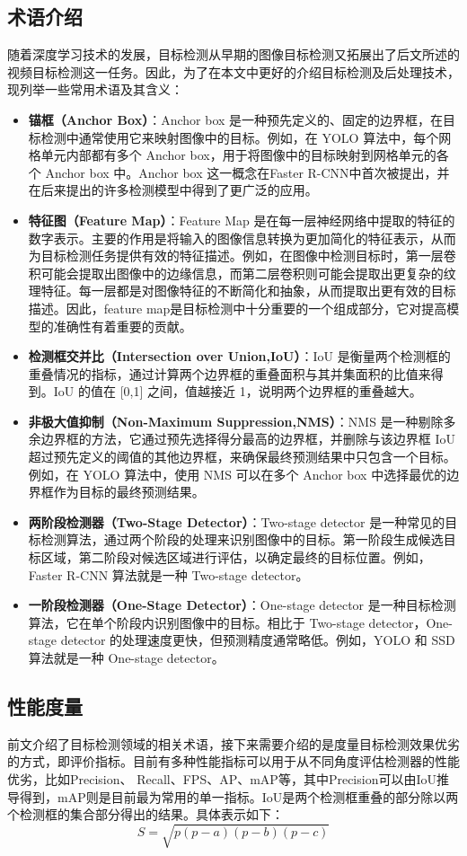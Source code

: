 \documentclass[winfonts,master,twoside,AutoFakeBold= {2}]{njuthesis}
\begin{document}
\subsection{术语介绍}
随着深度学习技术的发展，目标检测从早期的图像目标检测又拓展出了后文所述的视频目标检测这一任务。因此，为了在本文中更好的介绍目标检测及后处理技术，现列举一些常用术语及其含义：
\begin{itemize}
\item \textbf{锚框（Anchor Box）}：Anchor box 是一种预先定义的、固定的边界框，在目标检测中通常使用它来映射图像中的目标。例如，在 YOLO 算法中，每个网格单元内部都有多个 Anchor box，用于将图像中的目标映射到网格单元的各个 Anchor box 中。Anchor box 这一概念在Faster R-CNN中首次被提出，并在后来提出的许多检测模型中得到了更广泛的应用。
\item \textbf{特征图（Feature Map）}：Feature Map 是在每一层神经网络中提取的特征的数字表示。主要的作用是将输入的图像信息转换为更加简化的特征表示，从而为目标检测任务提供有效的特征描述。例如，在图像中检测目标时，第一层卷积可能会提取出图像中的边缘信息，而第二层卷积则可能会提取出更复杂的纹理特征。每一层都是对图像特征的不断简化和抽象，从而提取出更有效的目标描述。因此，feature map是目标检测中十分重要的一个组成部分，它对提高模型的准确性有着重要的贡献。
\item \textbf{检测框交并比（Intersection over Union,IoU）}：IoU 是衡量两个检测框的重叠情况的指标，通过计算两个边界框的重叠面积与其并集面积的比值来得到。IoU 的值在 [0,1] 之间，值越接近 1，说明两个边界框的重叠越大。
\item \textbf{非极大值抑制（Non-Maximum Suppression,NMS）}：NMS 是一种剔除多余边界框的方法，它通过预先选择得分最高的边界框，并删除与该边界框 IoU 超过预先定义的阈值的其他边界框，来确保最终预测结果中只包含一个目标。例如，在 YOLO 算法中，使用 NMS 可以在多个 Anchor box 中选择最优的边界框作为目标的最终预测结果。
\item \textbf{两阶段检测器（Two-Stage Detector）}：Two-stage detector 是一种常见的目标检测算法，通过两个阶段的处理来识别图像中的目标。第一阶段生成候选目标区域，第二阶段对候选区域进行评估，以确定最终的目标位置。例如，Faster R-CNN 算法就是一种 Two-stage detector。
\item \textbf{一阶段检测器（One-Stage Detector）}：One-stage detector 是一种目标检测算法，它在单个阶段内识别图像中的目标。相比于 Two-stage detector，One-stage detector 的处理速度更快，但预测精度通常略低。例如，YOLO 和 SSD 算法就是一种 One-stage detector。
\end{itemize}
\subsection{性能度量}
前文介绍了目标检测领域的相关术语，接下来需要介绍的是度量目标检测效果优劣的方式，即评价指标。目前有多种性能指标可以用于从不同角度评估检测器的性能优劣，比如Precision、 Recall、FPS、AP、mAP等，其中Precision可以由IoU推导得到，mAP则是目前最为常用的单一指标。IoU是两个检测框重叠的部分除以两个检测框的集合部分得出的结果。具体表示如下：
\begin{equation}
S=\sqrt{p(p-a)(p-b)(p-c)}
\end{equation}
\end{document}
